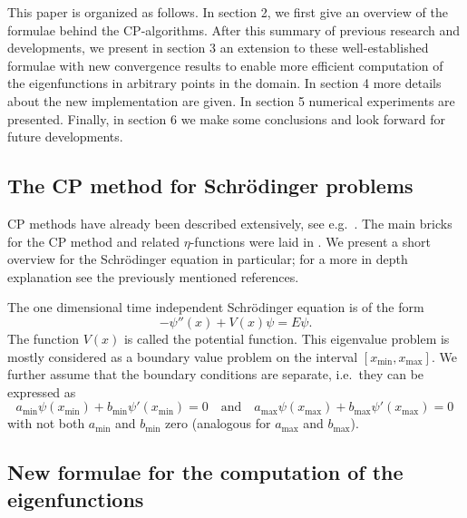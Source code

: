 This paper is organized as follows. In section 2, we first give an overview of the formulae behind the CP-algorithms. After this summary of previous research and developments, we present in section 3 an extension to these well-established formulae with new convergence results to enable more efficient computation of the eigenfunctions in arbitrary points in the domain.
In section 4 more details about the new implementation are given.
In section 5 numerical experiments are presented. %
Finally, in section 6 we make some conclusions and look forward for future developments.

\subsection{The CP method for Schrödinger problems}\label{the-method}

CP methods have already been described extensively, see e.g.\ \cite{ixaru_numerical_1984,ixaru_cp_1998,ixaru_cp_2000,ledoux_cp_2004}. The main bricks for the CP method and related $\eta$-functions were laid in \cite{ixaru_numerical_1984}. We present a short overview for the Schrödinger equation in particular; for a more in depth explanation see the previously mentioned references.

The one dimensional time independent Schrödinger equation is of the form
\[
    -\psi''(x) + V(x)\psi = E\psi\text{.}
\] The function $V(x)$ is called the potential function.
This eigenvalue problem is mostly considered as a boundary value problem on
the interval \([x_\text{min}, x_\text{max}]\). We further assume that the boundary
conditions are separate, i.e.\ they can be expressed as
\[
    a_\text{min} \psi(x_\text{min}) + b_\text{min}\psi'(x_\text{min}) = 0
    \quad \mbox{and} \quad
    a_\text{max} \psi(x_\text{max}) + b_\text{max}\psi'(x_\text{max}) = 0\,
\]
with not both $a_\text{min}$ and $b_\text{min}$ zero (analogous for $a_\text{max}$ and $b_\text{max}$).



\subsection{New formulae for the computation of the eigenfunctions}\label{sec:c2_cp_in_delta}

